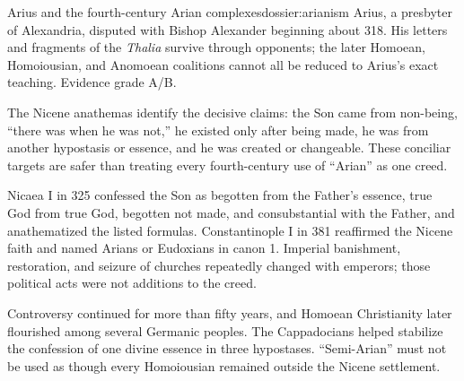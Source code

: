 \begin{heresydossier}{Arius and the fourth-century Arian complexes}{dossier:arianism}
\objectfield Arius, a presbyter of Alexandria, disputed with Bishop Alexander beginning about 318. His letters and fragments of the \emph{Thalia} survive through opponents; the later Homoean, Homoiousian, and Anomoean coalitions cannot all be reduced to Arius's exact teaching. Evidence grade A/B.

\propositionfield The Nicene anathemas identify the decisive claims: the Son came from non-being, ``there was when he was not,'' he existed only after being made, he was from another hypostasis or essence, and he was created or changeable. These conciliar targets are safer than treating every fourth-century use of ``Arian'' as one creed.

\responsefield Nicaea I in 325 confessed the Son as begotten from the Father's essence, true God from true God, begotten not made, and consubstantial with the Father, and anathematized the listed formulas. Constantinople I in 381 reaffirmed the Nicene faith and named Arians or Eudoxians in canon 1. Imperial banishment, restoration, and seizure of churches repeatedly changed with emperors; those political acts were not additions to the creed.

\aftermathfield Controversy continued for more than fifty years, and Homoean Christianity later flourished among several Germanic peoples. The Cappadocians helped stabilize the confession of one divine essence in three hypostases. ``Semi-Arian'' must not be used as though every Homoiousian remained outside the Nicene settlement.
\end{heresydossier}

